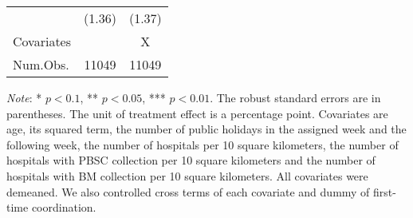 \documentclass[12pt, a4paper]{article}
\begin{document}
\begin{table}[H]
\begin{threeparttable}
\begin{tabular}[t]{>{\raggedright\arraybackslash}p{30em}cc}
\hspace{1em} & (1.36) & (1.37)\\
Covariates &  & X\\
Num.Obs. & \num{11049} & \num{11049}\\
\bottomrule
\end{tabular}
\begin{tablenotes}
\item \emph{Note}: * $p < 0.1$, ** $p < 0.05$, *** $p < 0.01$. The robust standard errors are in parentheses. The unit of treatment effect is a percentage point. Covariates are age, its squared term, the number of public holidays in the assigned week and the following week, the number of hospitals per 10 square kilometers, the number of hospitals with PBSC collection per 10 square kilometers and the number of hospitals with BM collection per 10 square kilometers. All covariates were demeaned. We also controlled cross terms of each covariate and dummy of first-time coordination.
\end{tablenotes}
\end{threeparttable}
\end{table}
\end{document}

